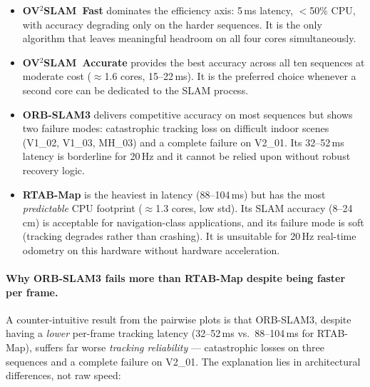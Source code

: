 \documentclass[11pt]{article}
\begin{document}
\begin{itemize}
  \item \textbf{OV$^2$SLAM~Fast} dominates the efficiency axis: 5\,ms latency, $<$50\% CPU, with accuracy degrading only on the harder sequences.
        It is the only algorithm that leaves meaningful headroom on all four cores simultaneously.

  \item \textbf{OV$^2$SLAM~Accurate} provides the best accuracy across all ten sequences at moderate cost ($\approx$1.6 cores, 15--22\,ms).
        It is the preferred choice whenever a second core can be dedicated to the SLAM process.

  \item \textbf{ORB-SLAM3} delivers competitive accuracy on most sequences but shows two failure modes: catastrophic tracking loss on difficult indoor scenes (V1\_02, V1\_03, MH\_03) and a complete failure on V2\_01.
        Its 32--52\,ms latency is borderline for 20\,Hz and it cannot be relied upon without robust recovery logic.

  \item \textbf{RTAB-Map} is the heaviest in latency (88--104\,ms) but has the most \emph{predictable} CPU footprint ($\approx$1.3 cores, low std).
        Its SLAM accuracy (8--24\,cm) is acceptable for navigation-class applications, and its failure mode is soft (tracking degrades rather than crashing).
        It is unsuitable for 20\,Hz real-time odometry on this hardware without hardware acceleration.
\end{itemize}

\paragraph{Why ORB-SLAM3 fails more than RTAB-Map despite being faster per frame.}
A counter-intuitive result from the pairwise plots is that ORB-SLAM3, despite having a \emph{lower} per-frame tracking latency (32--52\,ms vs.\ 88--104\,ms for RTAB-Map), suffers far worse \emph{tracking reliability} — catastrophic losses on three sequences and a complete failure on V2\_01.
The explanation lies in architectural differences, not raw speed:
\end{document}
